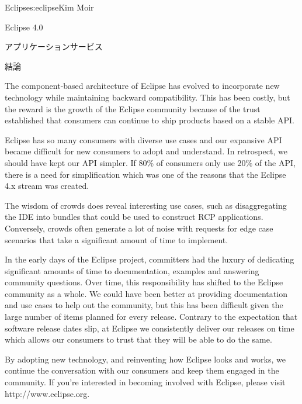 \begin{aosachapter}{Eclipse}{s:eclipse}{Kim Moir}
\begin{aosasect1}{Eclipse 4.0}
\begin{aosasect2}{アプリケーションサービス}
\end{aosasect2}

\end{aosasect1}

\begin{aosasect1}{結論}

The component-based architecture of Eclipse has evolved to incorporate
new technology while maintaining backward compatibility.  This has
been costly, but the reward is the growth of the Eclipse community
because of the trust established that consumers can continue to ship
products based on a stable API.

Eclipse has so many consumers with diverse use cases and our expansive
API became difficult for new consumers to adopt and understand. In
retrospect, we should have kept our API simpler. If 80\% of consumers
only use 20\% of the API, there is a need for simplification which was
one of the reasons that the Eclipse 4.x stream was created.

The wisdom of crowds does reveal interesting use cases, such as
disaggregating the IDE into bundles that could be used to construct
RCP applications.  Conversely, crowds often generate a lot of noise
with requests for edge case scenarios that take a significant amount
of time to implement.

In the early days of the Eclipse project, committers had the luxury of
dedicating significant amounts of time to documentation, examples and
answering community questions. Over time, this responsibility has
shifted to the Eclipse community as a whole.  We could have been
better at providing documentation and use cases to help out the
community, but this has been difficult given the large number of items
planned for every release.  Contrary to the expectation that software
release dates slip, at Eclipse we consistently deliver our releases on
time which allows our consumers to trust that they will be able to do
the same.

By adopting new technology, and reinventing how Eclipse looks and
works, we continue the conversation with our consumers and keep
them engaged in the community. If you're interested in becoming
involved with Eclipse, please visit http://www.eclipse.org.
\end{aosasect1}

\end{aosachapter}
